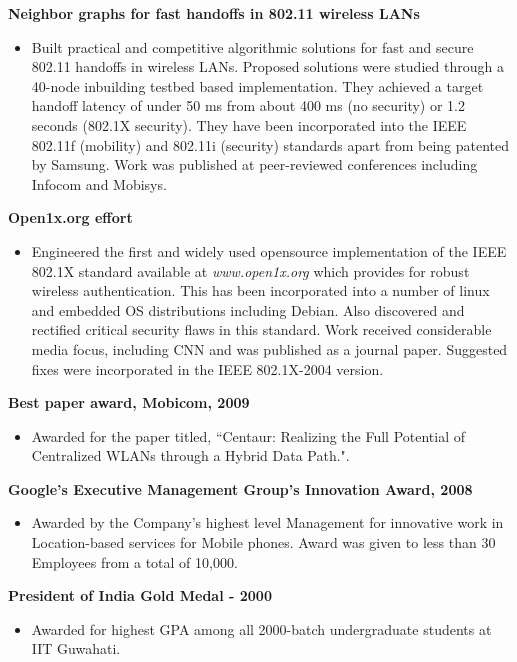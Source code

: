 \begin{resume}
{\bf Neighbor graphs for fast handoffs in 802.11 wireless LANs}
    \begin{itemize}
    \item []
  	Built practical and competitive algorithmic solutions for fast and secure 802.11 handoffs in wireless LANs.
       Proposed solutions were studied through a 40-node inbuilding testbed based implementation. They achieved 
       a target handoff latency of under 50 ms from about 400 ms (no security) or 1.2 seconds (802.1X security).
	They have been incorporated into the IEEE 802.11f (mobility) and 802.11i (security) standards apart from being
       patented by Samsung. Work was published at peer-reviewed conferences including Infocom and Mobisys.
    \end{itemize}
\vspace{-0.2cm}
{\bf Open1x.org effort}
    \begin{itemize}
	\item [] Engineered the first and widely used opensource implementation of the IEEE 802.1X standard available at
{\it www.open1x.org} which provides for robust wireless authentication. This has been incorporated into a number of linux
and embedded OS distributions including Debian. Also discovered and rectified critical security flaws in this standard. 
Work received considerable media focus, including CNN and was published as a journal paper. Suggested fixes were
incorporated in the IEEE 802.1X-2004 version.
    \end{itemize}


{\bf Best paper award, Mobicom, 2009}
    \begin{itemize}
         \item[] Awarded for the paper titled, ``Centaur: Realizing the Full Potential of Centralized WLANs through a Hybrid Data Path.".
    \end{itemize}

{\bf Google's Executive Management Group's Innovation Award, 2008}
    \begin{itemize}
         \item[] Awarded by the Company's highest level Management for innovative work in
	 Location-based services for Mobile phones. Award was given to less than 30 Employees from a total of 10,000.
    \end{itemize}

{\bf President of India Gold Medal - 2000}
    \begin{itemize}
         \item[] Awarded for highest GPA among all 2000-batch undergraduate students at IIT Guwahati.
    \end{itemize}



\end{resume}
